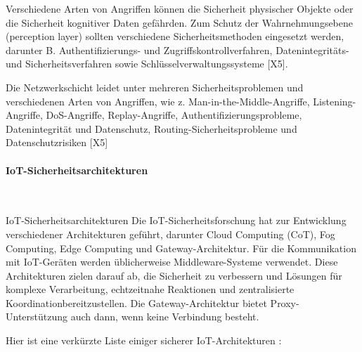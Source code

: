 Verschiedene Arten von Angriffen können die Sicherheit physischer Objekte oder die Sicherheit kognitiver Daten gefährden. Zum Schutz der Wahrnehmungsebene (perception layer)  sollten verschiedene Sicherheitsmethoden eingesetzt werden, darunter B. Authentifizierungs- und Zugriffskontrollverfahren, Datenintegritäts- und Sicherheitsverfahren sowie Schlüsselverwaltungssysteme [X5].

 Die Netzwerkschicht leidet unter mehreren Sicherheitsproblemen und verschiedenen Arten von Angriffen, wie z. Man-in-the-Middle-Angriffe, Listening-Angriffe, DoS-Angriffe, Replay-Angriffe, Authentifizierungsprobleme, Datenintegrität und Datenschutz, Routing-Sicherheitsprobleme und Datenschutzrisiken [X5]\cite{khatoun2022cybersecurity}


\paragraph{IoT-Sicherheitsarchitekturen}
\

IoT-Sicherheitsarchitekturen
Die IoT-Sicherheitsforschung hat zur Entwicklung verschiedener Architekturen geführt, darunter Cloud Computing (CoT), Fog Computing, Edge Computing und Gateway-Architektur. Für die Kommunikation mit IoT-Geräten werden üblicherweise Middleware-Systeme verwendet. Diese Architekturen zielen darauf ab, die Sicherheit zu verbessern und Lösungen für komplexe Verarbeitung, echtzeitnahe Reaktionen und zentralisierte Koordinationbereitzustellen. Die Gateway-Architektur bietet Proxy-Unterstützung auch dann, wenn keine Verbindung besteht.\cite{khatoun2022cybersecurity}

Hier ist eine verkürzte Liste einiger sicherer IoT-Architekturen \cite{khatoun2022cybersecurity}:

